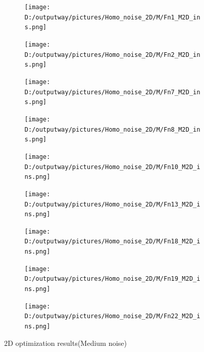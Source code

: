 \documentclass{article}
\begin{document}
\begin{figure}[H]
    \centering
    \begin{subfigure}[t]{.32\linewidth}
        \centering
        \texttt{[image: D:/outputway/pictures/Homo\_noise\_2D/M/Fn1\_M2D\_ins.png]}
    \end{subfigure}
    \begin{subfigure}[t]{.32\linewidth}
        \centering
        \texttt{[image: D:/outputway/pictures/Homo\_noise\_2D/M/Fn2\_M2D\_ins.png]}
    \end{subfigure}
    \begin{subfigure}[t]{.32\linewidth}
        \centering
        \texttt{[image: D:/outputway/pictures/Homo\_noise\_2D/M/Fn7\_M2D\_ins.png]}
    \end{subfigure}
    \begin{subfigure}[t]{.32\linewidth}
        \centering
        \texttt{[image: D:/outputway/pictures/Homo\_noise\_2D/M/Fn8\_M2D\_ins.png]}
    \end{subfigure}
    \begin{subfigure}[t]{.32\linewidth}
        \centering
        \texttt{[image: D:/outputway/pictures/Homo\_noise\_2D/M/Fn10\_M2D\_ins.png]}
    \end{subfigure}
    \begin{subfigure}[t]{.32\linewidth}
        \centering
        \texttt{[image: D:/outputway/pictures/Homo\_noise\_2D/M/Fn13\_M2D\_ins.png]}
    \end{subfigure}
    \begin{subfigure}[t]{.32\linewidth}
        \centering
        \texttt{[image: D:/outputway/pictures/Homo\_noise\_2D/M/Fn18\_M2D\_ins.png]}
    \end{subfigure}
    \begin{subfigure}[t]{.32\linewidth}
        \centering
        \texttt{[image: D:/outputway/pictures/Homo\_noise\_2D/M/Fn19\_M2D\_ins.png]}
    \end{subfigure}
    \begin{subfigure}[t]{.32\linewidth}
        \centering
        \texttt{[image: D:/outputway/pictures/Homo\_noise\_2D/M/Fn22\_M2D\_ins.png]}
    \end{subfigure}
    \caption{2D optimization results(Medium noise)}
    \label{Fig3}
\end{figure}
\end{document}
